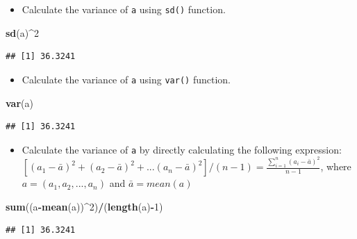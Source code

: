 \documentclass[]{book}
\newenvironment{Shaded}{\begin{snugshade}}{\end{snugshade}}
\newcommand{\DecValTok}[1]{\textcolor[rgb]{0.00,0.00,0.81}{#1}}
\newcommand{\KeywordTok}[1]{\textcolor[rgb]{0.13,0.29,0.53}{\textbf{#1}}}
\newcommand{\NormalTok}[1]{#1}
\newcommand{\OperatorTok}[1]{\textcolor[rgb]{0.81,0.36,0.00}{\textbf{#1}}}
\providecommand{\tightlist}{%
  \setlength{\itemsep}{0pt}\setlength{\parskip}{0pt}}
\begin{document}
\begin{itemize}
\tightlist
\item
  Calculate the variance of \texttt{a} using \texttt{sd()} function.
\end{itemize}

\begin{Shaded}
\begin{Highlighting}[]
\KeywordTok{sd}\NormalTok{(a)}\OperatorTok{^}\DecValTok{2}
\end{Highlighting}
\end{Shaded}

\begin{verbatim}
## [1] 36.3241
\end{verbatim}

\begin{itemize}
\tightlist
\item
  Calculate the variance of \texttt{a} using \texttt{var()} function.
\end{itemize}

\begin{Shaded}
\begin{Highlighting}[]
\KeywordTok{var}\NormalTok{(a)}
\end{Highlighting}
\end{Shaded}

\begin{verbatim}
## [1] 36.3241
\end{verbatim}

\begin{itemize}
\tightlist
\item
  Calculate the variance of \texttt{a} by directly calculating the following expression: \([(a_1 - \bar{a})^2 + (a_2 - \bar{a})^2 + ... (a_n - \bar{a})^2]/(n-1) = \frac{\sum_{i=1}^{n}(a_i-\bar{a})^2}{n-1}\), where \(a = (a_1, a_2, ... , a_n)\) and \(\bar{a} = mean(a)\)
\end{itemize}

\begin{Shaded}
\begin{Highlighting}[]
\KeywordTok{sum}\NormalTok{((a}\OperatorTok{-}\KeywordTok{mean}\NormalTok{(a))}\OperatorTok{^}\DecValTok{2}\NormalTok{)}\OperatorTok{/}\NormalTok{(}\KeywordTok{length}\NormalTok{(a)}\OperatorTok{-}\DecValTok{1}\NormalTok{)}
\end{Highlighting}
\end{Shaded}

\begin{verbatim}
## [1] 36.3241
\end{verbatim}
\end{document}
